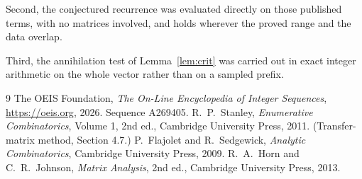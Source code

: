 \documentclass[11pt,a4paper]{article}
\theoremstyle{plain}
\theoremstyle{definition}
\begin{document}
Second, the conjectured recurrence was evaluated directly on those published terms, with no
matrices involved, and holds wherever the proved range and the data overlap.

Third, the annihilation test of Lemma~\ref{lem:crit} was carried out in exact integer
arithmetic on the whole vector rather than on a sampled prefix.

\begin{thebibliography}{9}
 The OEIS Foundation, \emph{The On-Line Encyclopedia of Integer
Sequences}, \url{https://oeis.org}, 2026. Sequence A269405.
 R.~P.~Stanley, \emph{Enumerative Combinatorics}, Volume 1, 2nd ed.,
Cambridge University Press, 2011. (Transfer-matrix method, Section 4.7.)
 P.~Flajolet and R.~Sedgewick, \emph{Analytic Combinatorics}, Cambridge
University Press, 2009.
 R.~A.~Horn and C.~R.~Johnson, \emph{Matrix Analysis}, 2nd ed., Cambridge
University Press, 2013.
\end{thebibliography}
\end{document}
